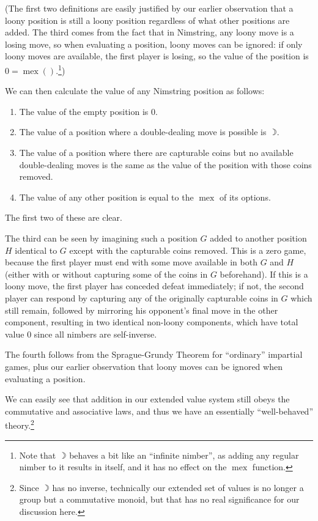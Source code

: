 \documentclass[a4paper,twocolumn]{article}
\DeclareMathOperator{\mex}{mex}
\newcommand{\loony}{\rightmoon}
\begin{document}
(The first two definitions are easily justified by our earlier
observation that a loony position is still a loony position regardless
of what other positions are added. The third comes from the fact that
in Nimstring, any loony move is a losing move, so when evaluating a
position, loony moves can be ignored: if only loony moves are
available, the first player is losing, so the value of the position is
$0 = \mex()$.\footnote{Note that $\loony$ behaves a bit like an
  ``infinite nimber'', as adding any regular nimber to it results in
  itself, and it has no effect on the $\mex$ function.})

We can then calculate the value of any Nimstring position as follows:

\begin{enumerate}
  \item The value of the empty position is $0$.
  \item The value of a position where a double-dealing move is
    possible is $\loony$.
  \item The value of a position where there are capturable coins but
    no available double-dealing moves is the same as the value of the
    position with those coins removed.
  \item The value of any other position is equal to the $\mex$ of
    its options.
\end{enumerate}

The first two of these are clear.

The third can be seen by imagining such a position $G$ added to
another position $H$ identical to $G$ except with the capturable coins
removed. This is a zero game, because the first player must end with
some move available in both $G$ and $H$ (either with or without
capturing some of the coins in $G$ beforehand). If this is a loony
move, the first player has conceded defeat immediately; if not, the
second player can respond by capturing any of the originally
capturable coins in $G$ which still remain, followed by mirroring his
opponent's final move in the other component, resulting in two
identical non-loony components, which have total value $0$ since all
nimbers are self-inverse.

The fourth follows from the Sprague-Grundy Theorem for ``ordinary''
impartial games, plus our earlier observation that loony moves can be
ignored when evaluating a position.

We can easily see that addition in our extended value system still
obeys the commutative and associative laws, and thus we have an
essentially ``well-behaved'' theory.\footnote{Since $\loony$ has no
  inverse, technically our extended set of values is no longer a group
  but a commutative monoid, but that has no real significance for our
  discussion here.}
\end{document}
